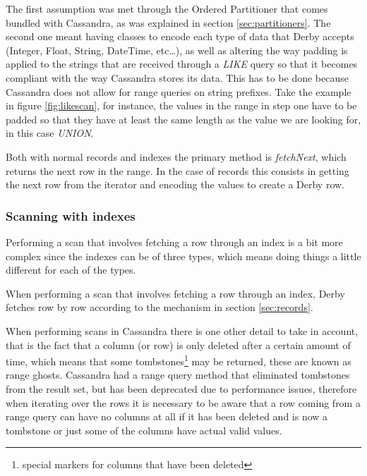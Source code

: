 The first assumption was met through the Ordered Partitioner that comes bundled with Cassandra, as was explained in section \ref{sec:partitioners}. The second one meant having classes to encode each type of data that Derby accepts (Integer, Float, String, DateTime, etc\ldots), as well as altering the way padding is applied to the strings that are received through a \emph{LIKE} query so that it becomes compliant with the way Cassandra stores its data. This has to be done because Cassandra does not allow for range queries on string prefixes. Take the example in figure \ref{fig:likescan}, for instance, the values in the range in step one have to be padded so that they have at least the same length as the value we are looking for, in this case \emph{UNION}. 

Both with normal records and indexes the primary method is \emph{fetchNext}, which returns the next row in the range. In the case of records this consists in getting the next row from the iterator and encoding the values to create a Derby row. 

\subsubsection{Scanning with indexes}

Performing a scan that involves fetching a row through an index is a bit more complex since the indexes can be of three types, which means doing things a little different for each of the types. 

When performing a scan that involves fetching a row through an index, Derby fetches row by row according to the mechanism in section \ref{sec:records}.

When performing scans in Cassandra there is one other detail to take in account, that is the fact that a column (or row) is only deleted after a certain amount of time, which means that some tombstones\footnote{special markers for columns that have been deleted} may be returned, these are known as range ghosts. Cassandra had a range query method that eliminated tombstones from the result set, but has been deprecated due to performance issues, therefore when iterating over the rows it is necessary to be aware that a row coming from a range query can have no columns at all if it has been deleted and is now a tombstone or just some of the columns have actual valid values.  



